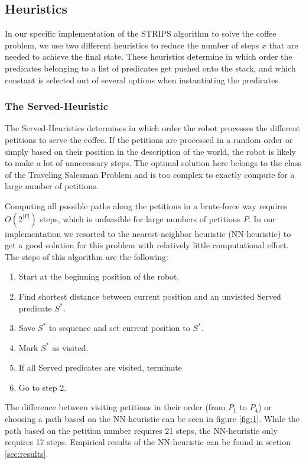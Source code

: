 \subsection{Heuristics}
\label{subsub:heuristics}

In our specific implementation of the STRIPS algorithm to solve the coffee problem, we use two different heuristics to reduce the number of steps $x$ that are needed to achieve the final state. These heuristics determine in which order the predicates belonging to a list of predicates get pushed onto the stack, and which constant is selected out of several options when instantiating the predicates.

\subsubsection{The Served-Heuristic}

The Served-Heuristics determines in which order the robot processes the different petitions to serve the coffee. If the petitions are processed in a random order or simply based on their position in the description of the world, the robot is likely to make a lot of unnecessary steps. The optimal solution here belongs to the class of the Traveling Salesman Problem and is too complex to exactly compute for a large number of petitions.

Computing all possible paths along the petitions in a brute-force way requires $O(2^{|P|})$ steps, which is unfeasible for large numbers of petitions $P$. In our implementation we resorted to the nearest-neighbor heuristic (NN-heuristic) to get a good solution for this problem with relatively little computational effort. The steps of this algorithm are the following:

\begin{enumerate}
	\item Start at the beginning position of the robot.
	\item Find shortest distance between current position and an unvisited Served predicate $S^*$.
	\item Save $S^*$ to sequence and set current position to $S^*$.
	\item Mark $S^*$ as visited.
	\item If all Served predicates are visited, terminate
	\item Go to step 2.
\end{enumerate} 

The difference between visiting petitions in their order (from $P_1$ to $P_4$) or choosing a path based on the NN-heuristic can be seen in figure \ref{fig:1}. While the path based on the petition number requires 21 steps, the NN-heuristic only requires 17 steps. Empirical results of the NN-heuristic can be found in section \ref{sec:results}.

